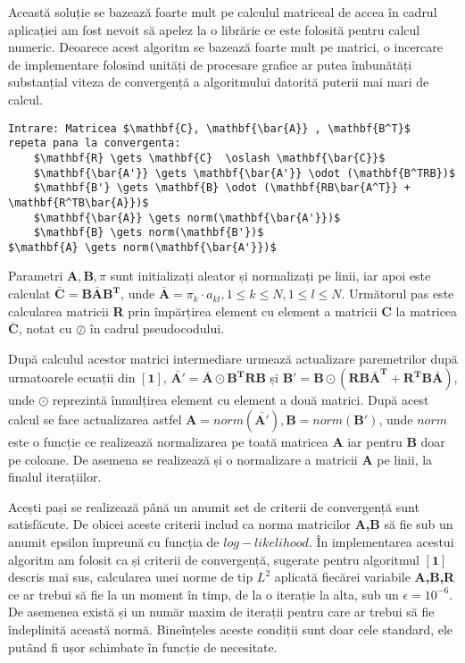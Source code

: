 Această soluție se bazează foarte mult pe calculul matriceal de accea în cadrul aplicației am fost nevoit să apelez la o librărie ce este folosită pentru calcul numeric. Deoarece acest algoritm se bazează foarte mult pe matrici, o incercare de implementare folosind unități de procesare grafice ar putea îmbunătăți substanțial viteza de convergență a algoritmului datorită puterii mai mari de calcul.\par

\begin{lstlisting}[mathescape=true, caption=Pseudocod ce descrie algoritmul de inferență]
Intrare: Matricea $\mathbf{C}, \mathbf{\bar{A}} , \mathbf{B^T}$
repeta pana la convergenta:
	$\mathbf{R} \gets \mathbf{C}  \oslash \mathbf{\bar{C}}$
	$\mathbf{\bar{A'}} \gets \mathbf{\bar{A'}} \odot (\mathbf{B^TRB})$
	$\mathbf{B'} \gets \mathbf{B} \odot (\mathbf{RB\bar{A^T}} + \mathbf{R^TB\bar{A}})$
	$\mathbf{\bar{A}} \gets norm(\mathbf{\bar{A'}})$
	$\mathbf{B} \gets norm(\mathbf{B'})$
$\mathbf{A} \gets norm(\mathbf{\bar{A'}})$
\end{lstlisting}

Parametri $\textbf{A},\textbf{B},\pi$ sunt initializați aleator și normalizați pe linii, iar apoi este calculat $\mathbf{\bar{C} = B\bar{A}B^{T}}$, unde $\mathbf{\bar{A}} = {\pi_{k}\cdot a_{kl}}, 1 \leq k \leq N, 1\leq l \leq N$. Următorul pas este calcularea matricii \textbf{R} prin împărțirea element cu element a matricii \textbf{C} la matricea $\mathbf{\bar{C}}$, notat cu $\oslash$ în cadrul pseudocodului.\par

După calculul acestor matrici intermediare urmează actualizare paremetrilor după urmatoarele ecuații din ${\mathbf{[1]}}$, $\mathbf{\bar{A'} = \bar{A} \odot B^{T}RB}$ și $\mathbf{B'} = \mathbf{B} \odot \mathbf{(RB\bar{A}^{T} + R^{T}B\bar{A})}$, unde $\odot$ reprezintă înmulțirea element cu element a două matrici. După acest calcul se face actualizarea astfel $\mathbf{A} = norm(\mathbf{\bar{A'}}),\mathbf{B} = norm(\mathbf{B'})$, unde $norm$ este o funcție ce realizează normalizarea pe toată matricea \textbf{A} iar pentru \textbf{B} doar pe coloane. De asemena se realizează și o normalizare a matricii \textbf{A} pe linii, la finalul iterațiilor.\par

Acești pași se realizează până un anumit set de criterii de convergență sunt satisfăcute. De obicei aceste criterii includ ca norma matricilor \textbf{A,B} să fie sub un anumit epsilon împreună cu funcția de $log-likelihood$. În implementarea acestui algoritm am folosit ca și criterii de convergență, sugerate pentru algoritmul ${\mathbf{[1]}}$ descris mai sus, calcularea unei norme de tip $L^{2}$ aplicată fiecărei variabile \textbf{A,B,R} ce ar trebui să fie la un moment în timp, de la o iterație la alta, sub un $\epsilon = 10^{-6}$. De asemenea există și un număr maxim de iterații pentru care ar trebui să fie îndeplinită această normă. Bineînțeles aceste condiții sunt doar cele standard, ele putând fi ușor schimbate în funcție de necesitate.\par

